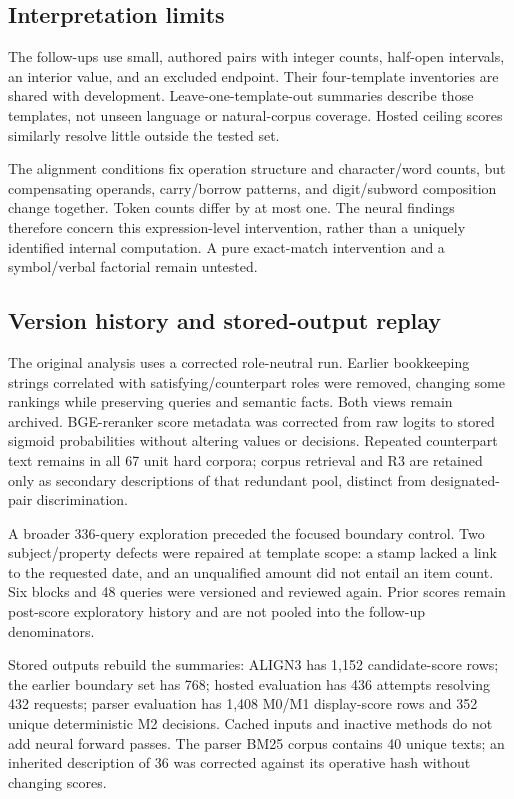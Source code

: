 \documentclass[conference,letterpaper]{IEEEtran}
\begin{document}
\subsection{Interpretation limits}
The follow-ups use small, authored pairs with integer counts, half-open intervals, an interior value, and an excluded endpoint. Their four-template inventories are shared with development. Leave-one-template-out summaries describe those templates, not unseen language or natural-corpus coverage. Hosted ceiling scores similarly resolve little outside the tested set.

The alignment conditions fix operation structure and character/word counts, but compensating operands, carry/borrow patterns, and digit/subword composition change together. Token counts differ by at most one. The neural findings therefore concern this expression-level intervention, rather than a uniquely identified internal computation. A pure exact-match intervention and a symbol/verbal factorial remain untested.

\subsection{Version history and stored-output replay}
The original analysis uses a corrected role-neutral run. Earlier bookkeeping strings correlated with satisfying/counterpart roles were removed, changing some rankings while preserving queries and semantic facts. Both views remain archived. BGE-reranker score metadata was corrected from raw logits to stored sigmoid probabilities without altering values or decisions. Repeated counterpart text remains in all 67 unit hard corpora; corpus retrieval and R3 are retained only as secondary descriptions of that redundant pool, distinct from designated-pair discrimination.

A broader 336-query exploration preceded the focused boundary control. Two subject/property defects were repaired at template scope: a stamp lacked a link to the requested date, and an unqualified amount did not entail an item count. Six blocks and 48 queries were versioned and reviewed again. Prior scores remain post-score exploratory history and are not pooled into the follow-up denominators.

Stored outputs rebuild the summaries: ALIGN3 has 1,152 candidate-score rows; the earlier boundary set has 768; hosted evaluation has 436 attempts resolving 432 requests; parser evaluation has 1,408 M0/M1 display-score rows and 352 unique deterministic M2 decisions. Cached inputs and inactive methods do not add neural forward passes. The parser BM25 corpus contains 40 unique texts; an inherited description of 36 was corrected against its operative hash without changing scores.
\end{document}
